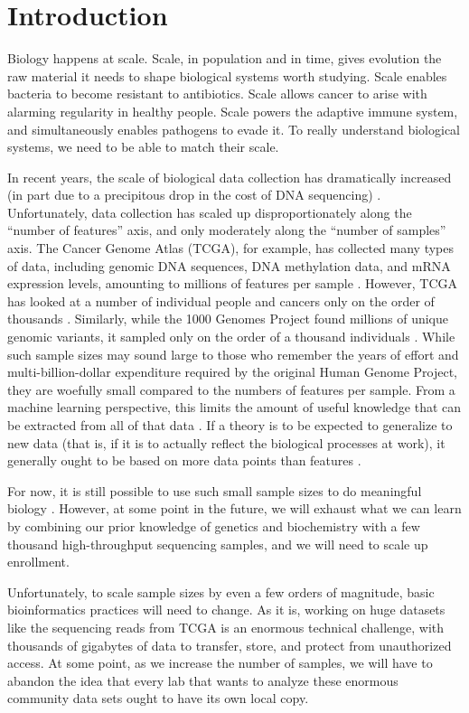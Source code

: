 \documentclass[11pt,proposal]{ucthesis}
\begin{document}
\chapter{Introduction}

Biology happens at scale. Scale, in population and in time, gives evolution the raw material it needs to shape biological systems worth studying. Scale enables bacteria to become resistant to antibiotics. Scale allows cancer to arise with alarming regularity in healthy people. Scale powers the adaptive immune system, and simultaneously enables pathogens to evade it. To really understand biological systems, we need to be able to match their scale.

In recent years, the scale of biological data collection has dramatically increased (in part due to a precipitous drop in the cost of DNA sequencing) \cite{wetterstrand2014dna}. Unfortunately, data collection has scaled up disproportionately along the ``number of features'' axis, and only moderately along the ``number of samples'' axis. The Cancer Genome Atlas (TCGA), for example, has collected many types of data, including genomic DNA sequences, DNA methylation data, and mRNA expression levels, amounting to millions of features per sample \cite{tcga2014sample}. However, TCGA has looked at a number of individual people and cancers only on the order of thousands \cite{tcga2014sample}. Similarly, while the 1000 Genomes Project found millions of unique genomic variants, it sampled only on the order of a thousand individuals \cite{10002010map}. While such sample sizes may sound large to those who remember the years of effort and multi-billion-dollar expenditure required by the original Human Genome Project, they are woefully small compared to the numbers of features per sample. From a machine learning perspective, this limits the amount of useful knowledge that can be extracted from all of that data \cite{hua2005optimal}. If a theory is to be expected to generalize to new data (that is, if it is to actually reflect the biological processes at work), it generally ought to be based on more data points than features \cite{hua2005optimal}.

For now, it is still possible to use such small sample sizes to do meaningful biology \cite{weinstein2013cancer}. However, at some point in the future, we will exhaust what we can learn by combining our prior knowledge of genetics and biochemistry with a few thousand high-throughput sequencing samples, and we will need to scale up enrollment.

Unfortunately, to scale sample sizes by even a few orders of magnitude, basic bioinformatics practices will need to change. As it is, working on huge datasets like the sequencing reads from TCGA is an enormous technical challenge, with thousands of gigabytes of data to transfer, store, and protect from unauthorized access. At some point, as we increase the number of samples, we will have to abandon the idea that every lab that wants to analyze these enormous community data sets ought to have its own local copy.
\end{document}
